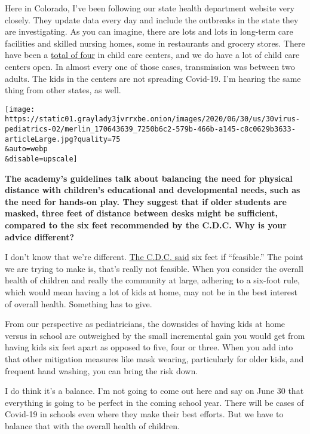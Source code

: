 Here in Colorado, I've been following our state health department
website very closely. They update data every day and include the
outbreaks in the state they are investigating. As you can imagine, there
are lots and lots in long-term care facilities and skilled nursing
homes, some in restaurants and grocery stores. There have been a
\href{https://covid19.colorado.gov/data/outbreak-data}{total of four} in
child care centers, and we do have a lot of child care centers open. In
almost every one of those cases, transmission was between two adults.
The kids in the centers are not spreading Covid-19. I'm hearing the same
thing from other states, as well.

\texttt{[image: https://static01.graylady3jvrrxbe.onion/images/2020/06/30/us/30virus-pediatrics-02/merlin\_170643639\_7250b6c2-579b-466b-a145-c8c0629b3633-articleLarge.jpg?quality=75\\\&auto=webp\\\&disable=upscale]}

\textbf{The academy's guidelines talk about balancing the need for
physical distance with children's educational and developmental needs,
such as the need for hands-on play. They suggest that if older students
are masked, three feet of distance between desks might be sufficient,
compared to the six feet recommended by the C.D.C. Why is your advice
different?}

I don't know that we're different.
\href{https://www.cdc.gov/coronavirus/2019-ncov/community/schools-childcare/schools.html}{The
C.D.C. said} six feet if ``feasible.'' The point we are trying to make
is, that's really not feasible. When you consider the overall health of
children and really the community at large, adhering to a six-foot rule,
which would mean having a lot of kids at home, may not be in the best
interest of overall health. Something has to give.

From our perspective as pediatricians, the downsides of having kids at
home versus in school are outweighed by the small incremental gain you
would get from having kids six feet apart as opposed to five, four or
three. When you add into that other mitigation measures like mask
wearing, particularly for older kids, and frequent hand washing, you can
bring the risk down.

I do think it's a balance. I'm not going to come out here and say on
June 30 that everything is going to be perfect in the coming school
year. There will be cases of Covid-19 in schools even where they make
their best efforts. But we have to balance that with the overall health
of children.

